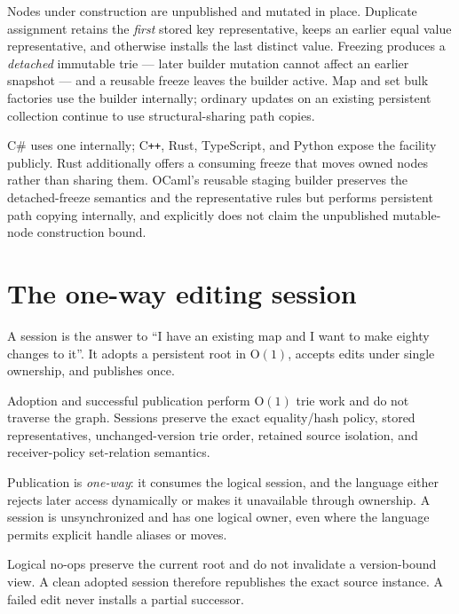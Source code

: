 \documentclass[11pt,twoside,openright]{book}
\newcommand{\bigoh}[1]{$\mathrm{O}(#1)$}
\begin{document}
\begin{contractbox}
Nodes under construction are unpublished and mutated in place. Duplicate
assignment retains the \emph{first} stored key representative, keeps an earlier
equal value representative, and otherwise installs the last distinct value.
Freezing produces a \emph{detached} immutable trie --- later builder mutation
cannot affect an earlier snapshot --- and a reusable freeze leaves the builder
active. Map and set bulk factories use the builder internally; ordinary updates
on an existing persistent collection continue to use structural-sharing path
copies.
\end{contractbox}

C\# uses one internally; C\texttt{++}, Rust, TypeScript, and Python expose the
facility publicly. Rust additionally offers a consuming freeze that moves owned
nodes rather than sharing them. OCaml's reusable staging builder preserves the
detached-freeze semantics and the representative rules but performs persistent
path copying internally, and explicitly does not claim the unpublished
mutable-node construction bound.

\section{The one-way editing session}

A session is the answer to ``I have an existing map and I want to make eighty
changes to it''. It adopts a persistent root in \bigoh{1}, accepts edits under
single ownership, and publishes once.

\begin{contractbox}
Adoption and successful publication perform \bigoh{1} trie work and do not
traverse the graph. Sessions preserve the exact equality/hash policy, stored
representatives, unchanged-version trie order, retained source isolation, and
receiver-policy set-relation semantics.

Publication is \emph{one-way}: it consumes the logical session, and the language
either rejects later access dynamically or makes it unavailable through
ownership. A session is unsynchronized and has one logical owner, even where the
language permits explicit handle aliases or moves.

Logical no-ops preserve the current root and do not invalidate a version-bound
view. A clean adopted session therefore republishes the exact source instance.
A failed edit never installs a partial successor.
\end{contractbox}
\end{document}
